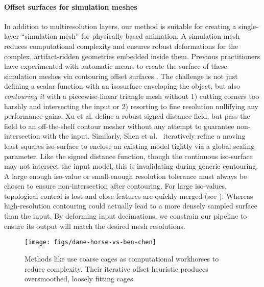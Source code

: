 \paragraph{Offset surfaces for simulation meshes}
In addition to multiresolution layers, our method is suitable for creating a
single-layer ``simulation mesh'' for physically based animation.
%
A simulation mesh reduces computational complexity and ensures robust
deformations for the complex, artifact-ridden geometries embedded inside them.
%
Previous practitioners have experimented with automatic means to create the
surface of these simulation meshes via contouring offset surfaces
\cite{Campen:2010}.
%
The challenge is not just defining a scalar function with an isosurface
enveloping the object, but also \emph{contouring it} with a piecewise-linear
triangle mesh without 1) cutting corners too harshly and intersecting the input
or 2) resorting to fine resolution nullifying any performance gains.
%
Xu et al.  define a robust signed distance field, but
pass the field to an off-the-shelf contour mesher without any attempt to
guarantee non-intersection with the input.
%
Similarly, Shen et al.\  iteratively refine a moving
least squares iso-surface to enclose an existing model tightly via a global
scaling parameter. Like the signed distance function, though the continuous
iso-surface may not intersect the input model, this is invalidating during
generic contouring.
%
A large enough iso-value or small-enough resolution tolerance must always be
chosen to ensure non-intersection after contouring.
%
For large iso-values, topological control is lost and close features are
quickly merged (see ).
%
Whereas high-resolution contouring could actually lead to a more densely sampled
surface than the input.
%
By deforming input decimations, we constrain our pipeline to ensure its output
will match the desired mesh resolutions. 

\begin{figure}
  \texttt{[image: figs/dane-horse-vs-ben-chen]}
  \caption{Methods like \protect\cite{Ben-Chen:2009:SDT} use coarse cages as
  computational workhorses to reduce complexity. Their iterative offset
  heuristic produces oversmoothed, loosely fitting cages.}
  \label{fig:dane-vs-ben-chen}
\end{figure}

